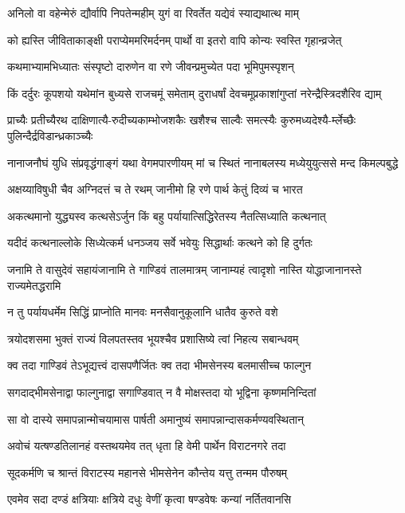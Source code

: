 \twolineshloka
{अनिलो वा वहेन्मेरुं द्यौर्वापि निपतेन्महीम्}
{युगं वा रिवर्तेत यद्येवं स्याद्यथात्थ माम्}


\twolineshloka
{को ह्यस्ति जीविताकाङ्क्षी पराप्येममरिमर्दनम्}
{पार्थो वा इतरो वापि कोन्यः स्वस्ति गृहान्व्रजेत्}


\twolineshloka
{कथमाभ्यामभिध्यातः संस्पृष्टो दारुणेन वा}
{रणे जीवन्प्रमुच्येत पदा भूमिपुमस्पृशन्}


\twolineshloka
{किं दर्दुरः कूपशयो यथेमांन बुध्यसे राजचमूं समेताम्}
{दुराधर्षां देवचमूप्रकाशांगुप्तां नरेन्द्रैस्त्रिदशैरिव द्याम्}


\twolineshloka
{प्राच्यैः प्रतीच्यैरथ दाक्षिणात्यै-रुदीच्यकाम्भोजशकैः खशैश्च}
{साल्वैः समत्स्यैः कुरुमध्यदेश्यै-र्म्लेच्छैः पुलिन्दैर्द्रविडान्ध्रकाञ्च्यैः}


\twolineshloka
{नानाजनौघं युधि संप्रवृद्धंगाङ्गं यथा वेगमपारणीयम्}
{मां च स्थितं नानाबलस्य मध्येयुयुत्ससे मन्द किमल्पबुद्धे}


\twolineshloka
{अक्षय्याविषुधी चैव अग्निदत्तं च ते रथम्}
{जानीमो हि रणे पार्थ केतुं दिव्यं च भारत}


\twolineshloka
{अकत्थमानो युद्ध्यस्व कत्थसेऽर्जुन किं बहु}
{पर्यायात्सिद्धिरेतस्य नैतत्सिध्याति कत्थनात्}


\twolineshloka
{यदीदं कत्थनाल्लोके सिध्येत्कर्म धनञ्जय}
{सर्वे भवेयुः सिद्धार्थाः कत्थने को हि दुर्गतः}


\twolineshloka
{जनामि ते वासुदेवं सहायंजानामि ते गाण्डिवं तालमात्रम्}
{जानाम्यहं त्वादृशो नास्ति योद्धाजानानस्ते राज्यमेतद्धरामि}


\twolineshloka
{न तु पर्यायधर्मेम सिद्धिं प्राप्नोति मानवः}
{मनसैवानुकूलानि धातैव कुरुते वशे}


\twolineshloka
{त्रयोदशसमा भुक्तं राज्यं विलपतस्तव}
{भूयश्चैव प्रशासिष्ये त्वां निहत्य सबान्धवम्}


\twolineshloka
{क्व तदा गाण्डिवं तेऽभूद्यत्त्वं दासपणैर्जितः}
{क्व तदा भीमसेनस्य बलमासीच्च फाल्गुन}


\twolineshloka
{सगदाद्भीमसेनाद्वा फाल्गुनाद्वा सगाण्डिवात्}
{न वै मोक्षस्तदा यो भूद्विना कृष्णमनिन्दितां}


\twolineshloka
{सा वो दास्ये समापन्नान्मोचयामास पार्षती}
{अमानुष्यं समापन्नान्दासकर्मण्यवस्थितान्}


\twolineshloka
{अवोचं यत्षण्डतिलानहं वस्तथयमेव तत्}
{धृता हि वेमी पार्थेन विराटनगरे तदा}


\twolineshloka
{सूदकर्मणि च श्रान्तं विराटस्य महानसे}
{भीमसेनेन कौन्तेय यत्तु तन्मम पौरुषम्}


\twolineshloka
{एवमेव सदा दण्डं क्षत्रियाः क्षत्रिये दधुः}
{वेणीं कृत्वा षण्डवेषः कन्यां नर्तितवानसि}


